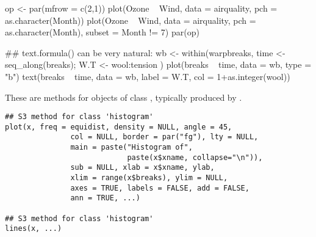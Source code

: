 %
\begin{Examples}
\begin{ExampleCode}
op <- par(mfrow = c(2,1))
plot(Ozone ~ Wind, data = airquality, pch = as.character(Month))
plot(Ozone ~ Wind, data = airquality, pch = as.character(Month),
     subset = Month != 7)
par(op)

## text.formula() can be very natural:
wb <- within(warpbreaks, {
    time <- seq_along(breaks); W.T <- wool:tension })
plot(breaks ~ time, data = wb, type = "b")
text(breaks ~ time, data = wb, label = W.T, col = 1+as.integer(wool))
\end{ExampleCode}
\end{Examples}
%
\begin{Description}\relax
These are methods for objects of class , typically
produced by .
\end{Description}
%
\begin{Usage}
\begin{verbatim}
## S3 method for class 'histogram'
plot(x, freq = equidist, density = NULL, angle = 45,
               col = NULL, border = par("fg"), lty = NULL,
               main = paste("Histogram of",
                            paste(x$xname, collapse="\n")),
               sub = NULL, xlab = x$xname, ylab,
               xlim = range(x$breaks), ylim = NULL,
               axes = TRUE, labels = FALSE, add = FALSE,
               ann = TRUE, ...)

## S3 method for class 'histogram'
lines(x, ...)
\end{verbatim}
\end{Usage}
%
